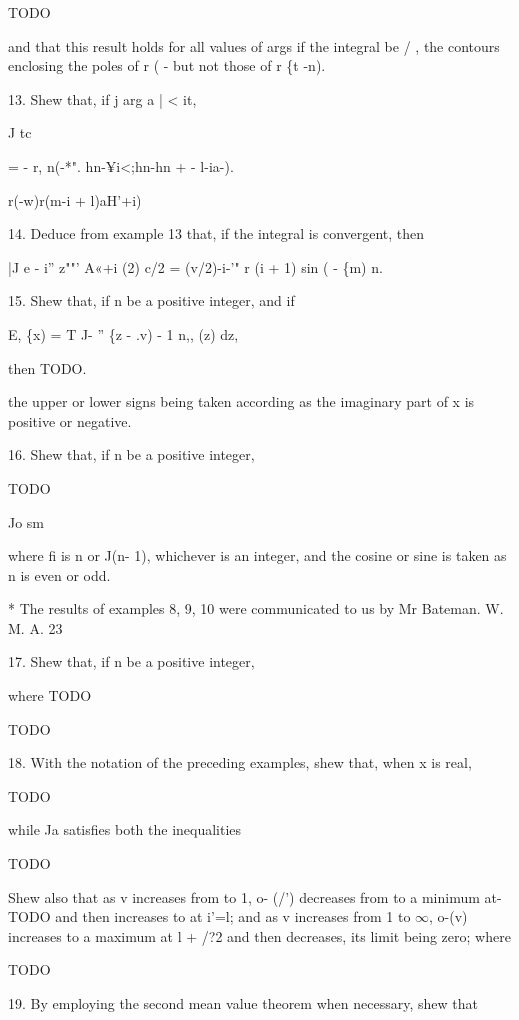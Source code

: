 TODO

and that this result holds for all values of args if the integral be /
, the contours enclosing the poles of r ( - but not those of r \{t
-n).

13. Shew that, if j arg a | < it,

J tc

= - r, n(-*". hn-¥i<;hn-hn + - l-ia-).

r(-w)r(m-i + l)aH'+i)

14. Deduce from example 13 that, if the integral is convergent, then

|J e - i'' z""' A«+i (2) c/2 = (v/2)-i-'" r (i + 1) sin ( - \{m) n.


15. Shew that, if n be a positive integer, and if

E, \{x) = T J- '' \{z - .v) - 1 n,, (z) dz,

then TODO.

the upper or lower signs being taken according as the imaginary part
of x is positive or negative. 

16. Shew that, if n be a positive integer,

TODO

Jo sm

where fi is n or J(n- 1), whichever is an integer, and the cosine or
sine is taken as n is even or odd. 

* The results of examples 8, 9, 10 were communicated to us by Mr
Bateman. W. M. A. 23

%
%

17. Shew that, if n be a positive integer,

where TODO

TODO 

18. With the notation of the preceding examples, shew that, when x is
real,

TODO

while Ja satisfies both the inequalities

TODO

Shew also that as v increases from to 1, o- (/') decreases from to a
minimum at- TODO and then increases to at i'=l; and as v increases
from 1 to $\infty$, o-(v) increases to a maximum at l + /?2 and then
decreases, its limit being zero; where

TODO 

19. By employing the second mean value theorem when necessary, shew
that

